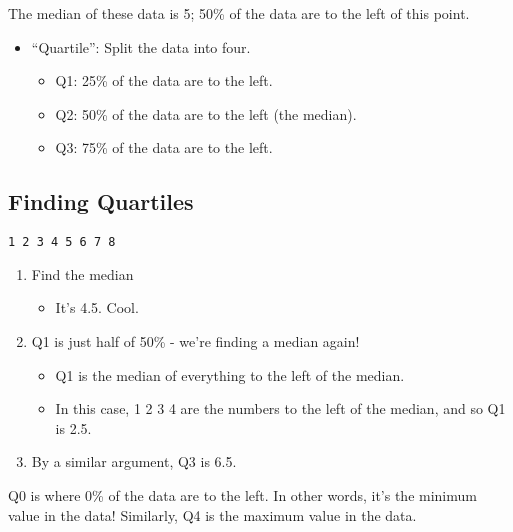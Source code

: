 \documentclass[
  letterpaper,
  DIV=11,
  numbers=noendperiod]{scrreprt}
\providecommand{\tightlist}{%
  \setlength{\itemsep}{0pt}\setlength{\parskip}{0pt}}\usepackage{longtable,booktabs,array}
\begin{document}
The median of these data is 5; 50\% of the data are to the left of this
point.

\begin{itemize}
\tightlist
\item
  ``Quartile'': Split the data into four.

  \begin{itemize}
  \tightlist
  \item
    Q1: 25\% of the data are to the left.
  \item
    Q2: 50\% of the data are to the left (the median).
  \item
    Q3: 75\% of the data are to the left.
  \end{itemize}
\end{itemize}

\hypertarget{finding-quartiles}{%
\subsection{Finding Quartiles}\label{finding-quartiles}}

\begin{verbatim}
1 2 3 4 5 6 7 8
\end{verbatim}

\begin{enumerate}
\def\labelenumi{\arabic{enumi}.}
\tightlist
\item
  Find the median

  \begin{itemize}
  \tightlist
  \item
    It's 4.5. Cool.
  \end{itemize}
\item
  Q1 is just half of 50\% - we're finding a median again!

  \begin{itemize}
  \tightlist
  \item
    Q1 is the median of everything to the left of the median.
  \item
    In this case, 1 2 3 4 are the numbers to the left of the median, and
    so Q1 is 2.5.
  \end{itemize}
\item
  By a similar argument, Q3 is 6.5.
\end{enumerate}

Q0 is where 0\% of the data are to the left. In other words, it's the
minimum value in the data! Similarly, Q4 is the maximum value in the
data.
\end{document}
